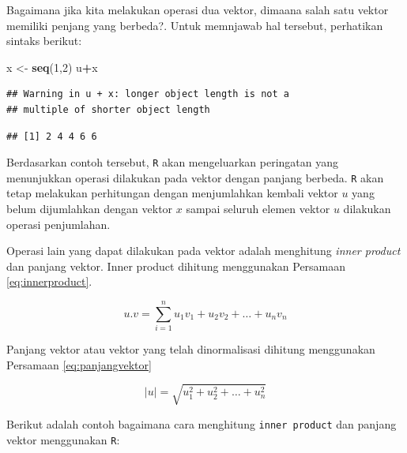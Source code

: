\documentclass[]{book}
\newenvironment{Shaded}{\begin{snugshade}}{\end{snugshade}}
\newcommand{\CommentTok}[1]{\textcolor[rgb]{0.56,0.35,0.01}{\textit{#1}}}
\newcommand{\DecValTok}[1]{\textcolor[rgb]{0.00,0.00,0.81}{#1}}
\newcommand{\KeywordTok}[1]{\textcolor[rgb]{0.13,0.29,0.53}{\textbf{#1}}}
\newcommand{\NormalTok}[1]{#1}
\newcommand{\OperatorTok}[1]{\textcolor[rgb]{0.81,0.36,0.00}{\textbf{#1}}}
\newcommand{\StringTok}[1]{\textcolor[rgb]{0.31,0.60,0.02}{#1}}
\theoremstyle{definition}
\theoremstyle{definition}
\theoremstyle{definition}
\theoremstyle{remark}
\begin{document}
Bagaimana jika kita melakukan operasi dua vektor, dimaana salah satu vektor memiliki penjang yang berbeda?. Untuk memnjawab hal tersebut, perhatikan sintaks berikut:

\begin{Shaded}
\begin{Highlighting}[]
\NormalTok{x <-}\StringTok{ }\KeywordTok{seq}\NormalTok{(}\DecValTok{1}\NormalTok{,}\DecValTok{2}\NormalTok{)}
\NormalTok{u}\OperatorTok{+}\NormalTok{x}
\end{Highlighting}
\end{Shaded}

\begin{verbatim}
## Warning in u + x: longer object length is not a
## multiple of shorter object length
\end{verbatim}

\begin{verbatim}
## [1] 2 4 4 6 6
\end{verbatim}

Berdasarkan contoh tersebut, \texttt{R} akan mengeluarkan peringatan yang menunjukkan operasi dilakukan pada vektor dengan panjang berbeda. \texttt{R} akan tetap melakukan perhitungan dengan menjumlahkan kembali vektor \(u\) yang belum dijumlahkan dengan vektor \(x\) sampai seluruh elemen vektor \(u\) dilakukan operasi penjumlahan.

Operasi lain yang dapat dilakukan pada vektor adalah menghitung \emph{inner product} dan panjang vektor. Inner product dihitung menggunakan Persamaan \eqref{eq:innerproduct}.

\begin{equation}
u.v=\sum_{i=1}^nu_1v_1+u_2v_2+\dots+u_nv_n
  \label{eq:innerproduct}
\end{equation}

Panjang vektor atau vektor yang telah dinormalisasi dihitung menggunakan Persamaan \eqref{eq:panjangvektor}

\begin{equation}
\left|u\right|=\sqrt{u_1^2+u_2^2+\dots+u_n^2}
  \label{eq:panjangvektor}
\end{equation}

Berikut adalah contoh bagaimana cara menghitung \texttt{inner\ product} dan panjang vektor menggunakan \texttt{R}:

\begin{Shaded}
\end{Shaded}
\end{document}
